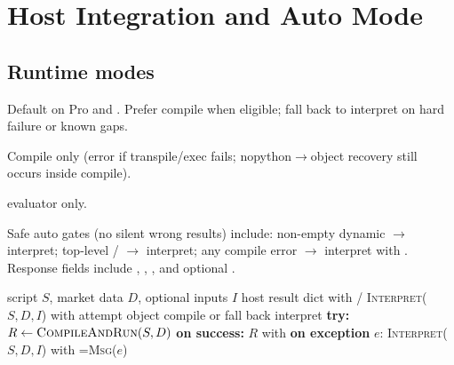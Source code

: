 \documentclass[11pt,a4paper]{article}
\begin{document}
\section{Host Integration and Auto Mode}
\label{sec:host}

\subsection{Runtime modes}

\begin{description}[leftmargin=*,style=nextline]
  \item[\code{auto}] Default on Pro \api{}  and .
        Prefer compile when eligible; fall back to interpret on hard failure
        or known gaps.
  \item[\code{compile}] Compile only (error if transpile/exec fails;
        nopython$\to$object recovery still occurs inside compile).
  \item[\code{interpret}] \ast{} evaluator only.
\end{description}

Safe auto gates (no silent wrong results) include: non-empty dynamic
 $\to$ interpret; top-level  / 
$\to$ interpret; any compile error $\to$ interpret with
. Response fields include
, , , and
optional .

\begin{algorithm}[t]
\caption{\textsc{AutoMode}(source, ohlcv, inputs)}
\label{alg:auto}
\begin{algorithmic}[1]
\Require script $S$, market data $D$, optional inputs $I$
\Ensure host result dict with /
  \State \Return \textsc{Interpret}($S,D,I$) with
\EndIf
{}
  \State attempt object compile or fall back interpret
\EndIf
\State \textbf{try:} $R \gets \textsc{CompileAndRun}(S,D)$
\State \textbf{on success:} \Return $R$ with 
\State \textbf{on exception} $e$:
\State \Return \textsc{Interpret}($S,D,I$) with
       =\textsc{Msg}($e$)
\end{algorithmic}
\end{algorithm}
\end{document}
